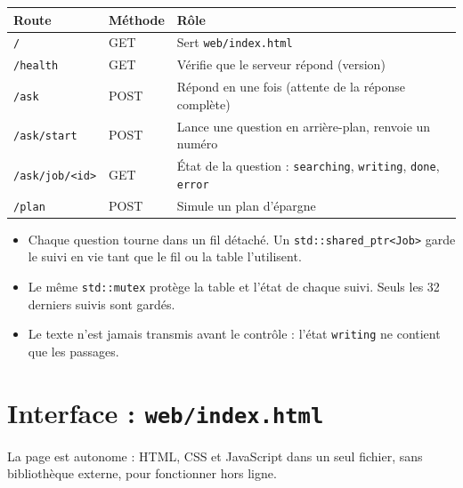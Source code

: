 \documentclass[11pt,a4paper]{article}
\newcommand{\fichier}[1]{\texttt{#1}}
\begin{document}
\begin{center}
\small
\begin{tabularx}{\linewidth}{@{}l l X@{}}
\toprule
Route & Méthode & Rôle \\
\midrule
\texttt{/} & GET & Sert \fichier{web/index.html} \\
\texttt{/health} & GET & Vérifie que le serveur répond (version) \\
\texttt{/ask} & POST & Répond en une fois (attente de la réponse complète) \\
\texttt{/ask/start} & POST & Lance une question en arrière-plan, renvoie un numéro \\
\texttt{/ask/job/<id>} & GET & État de la question : \texttt{searching}, \texttt{writing}, \texttt{done}, \texttt{error} \\
\texttt{/plan} & POST & Simule un plan d'épargne \\
\bottomrule
\end{tabularx}
\end{center}



\begin{itemize}
  \item Chaque question tourne dans un fil détaché. Un \texttt{std::shared\_ptr<Job>} garde le suivi en vie tant que le fil ou la table l'utilisent.
  \item Le même \texttt{std::mutex} protège la table et l'état de chaque suivi. Seuls les 32 derniers suivis sont gardés.
  \item Le texte n'est jamais transmis avant le contrôle : l'état \texttt{writing} ne contient que les passages.
\end{itemize}

\section{Interface : \texttt{web/index.html}}

La page est autonome : HTML, CSS et JavaScript dans un seul fichier, sans bibliothèque externe, pour fonctionner hors ligne.
\end{document}

